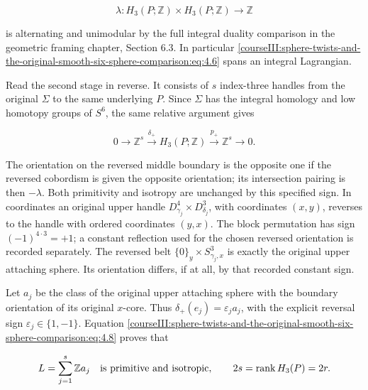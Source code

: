 \begin{equation}
\lambda:H_3(P;\mathbb Z)\times H_3(P;\mathbb Z)\longrightarrow\mathbb Z
 \label{courseIII:sphere-twists-and-the-original-smooth-six-sphere-comparison:eq:4.7}
\end{equation}

is alternating and unimodular by the full integral duality comparison in the geometric framing chapter, Section 6.3. In particular \eqref{courseIII:sphere-twists-and-the-original-smooth-six-sphere-comparison:eq:4.6} spans an integral Lagrangian.

Read the second stage in reverse. It consists of \(s\) index-three handles from the original \(\Sigma\) to the same underlying \(P\). Since \(\Sigma\) has the integral homology and low homotopy groups of \(S^6\), the same relative argument gives

\begin{equation}
0\longrightarrow\mathbb Z^s
      \xrightarrow{\delta_+}H_3(P;\mathbb Z)
      \xrightarrow{p_+}\mathbb Z^s\longrightarrow0 .
 \label{courseIII:sphere-twists-and-the-original-smooth-six-sphere-comparison:eq:4.8}
\end{equation}

The orientation on the reversed middle boundary is the opposite one if the reversed cobordism is given the opposite orientation; its intersection pairing is then \(-\lambda\). Both primitivity and isotropy are unchanged by this specified sign. In coordinates an original upper handle \(D^4_{\gamma_j}\times D^3_{\delta_j}\), with coordinates \((x,y)\), reverses to the handle with ordered coordinates \((y,x)\). The block permutation has sign \((-1)^{4\cdot3}=+1\); a constant reflection used for the chosen reversed orientation is recorded separately. The reversed belt \(\{0\}_y\times S^3_{\gamma_j,x}\) is exactly the original upper attaching sphere. Its orientation differs, if at all, by that recorded constant sign.

Let \(a_j\) be the class of the original upper attaching sphere with the boundary orientation of its original \(x\)-core. Thus \(\delta_+(e_j)=\varepsilon_j a_j\), with the explicit reversal sign \(\varepsilon_j\in\{1,-1\}\). Equation \eqref{courseIII:sphere-twists-and-the-original-smooth-six-sphere-comparison:eq:4.8} proves that

\begin{equation}
L=\sum_{j=1}^s\mathbb Za_j\quad\hbox{is primitive and isotropic},
 \qquad 2s=\operatorname{rank}H_3(P)=2r.
 \label{courseIII:sphere-twists-and-the-original-smooth-six-sphere-comparison:eq:4.9}
\end{equation}

